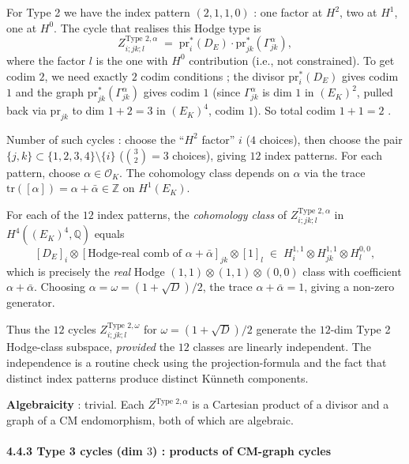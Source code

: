 \documentclass[
  11pt,
  a4paper,
]{amsart}
\begin{document}
For Type 2 we have the index pattern \((2, 1, 1, 0)\) : one factor at \(H^2\), two at \(H^1\), one at \(H^0\). The cycle that realises this Hodge type is
\[
Z^{\text{Type 2}, \alpha}_{i; jk; l} \;=\; \mathrm{pr}_i^*(D_E) \cdot \mathrm{pr}_{jk}^*(\Gamma_{jk}^\alpha),
\]
where the factor \(l\) is the one with \(H^0\) contribution (i.e., not constrained). To get codim \(2\), we need exactly \(2\) codim conditions ; the divisor \(\mathrm{pr}_i^*(D_E)\) gives codim \(1\) and the graph \(\mathrm{pr}_{jk}^*(\Gamma_{jk}^\alpha)\) gives codim \(1\) (since \(\Gamma_{jk}^\alpha\) is dim \(1\) in \((E_K)^2\), pulled back via \(\mathrm{pr}_{jk}\) to dim \(1 + 2 = 3\) in \((E_K)^4\), codim \(1\)). So total codim \(1 + 1 = 2\) .

Number of such cycles : choose the ``\(H^2\) factor'' \(i\) (\(4\) choices), then choose the pair \(\{j, k\} \subset \{1,2,3,4\} \setminus \{i\}\) (\(\binom{3}{2} = 3\) choices), giving \(12\) index patterns. For each pattern, choose \(\alpha \in \mathcal{O}_K\). The cohomology class depends on \(\alpha\) via the trace \(\mathrm{tr}([\alpha]) = \alpha + \bar\alpha \in \mathbb{Z}\) on \(H^1(E_K)\).

For each of the \(12\) index patterns, the \emph{cohomology class} of \(Z^{\text{Type 2}, \alpha}_{i;jk;l}\) in \(H^4((E_K)^4, \mathbb{Q})\) equals
\[
[D_E]_i \otimes [\text{Hodge-real comb of } \alpha + \bar\alpha]_{jk} \otimes [1]_l \;\in\; H^{1,1}_i \otimes H^{1,1}_{jk} \otimes H^{0,0}_l,
\]
which is precisely the \emph{real} Hodge \((1, 1) \otimes (1, 1) \otimes (0, 0)\) class with coefficient \(\alpha + \bar\alpha\). Choosing \(\alpha = \omega = (1 + \sqrt D)/2\), the trace \(\alpha + \bar\alpha = 1\), giving a non-zero generator.

Thus the \(12\) cycles \(Z^{\text{Type 2}, \omega}_{i;jk;l}\) for \(\omega = (1 + \sqrt D)/2\) generate the \(12\)-dim Type 2 Hodge-class subspace, \emph{provided} the \(12\) classes are linearly independent. The independence is a routine check using the projection-formula and the fact that distinct index patterns produce distinct Künneth components.

\textbf{Algebraicity} : trivial. Each \(Z^{\text{Type 2}, \alpha}\) is a Cartesian product of a divisor and a graph of a CM endomorphism, both of which are algebraic.

\hypertarget{type-3-cycles-dim-3-products-of-cm-graph-cycles}{%
\paragraph{\texorpdfstring{4.4.3 Type 3 cycles (dim \(3\)) : products of CM-graph cycles}{4.4.3 Type 3 cycles (dim 3) : products of CM-graph cycles}}\label{type-3-cycles-dim-3-products-of-cm-graph-cycles}}
\end{document}

